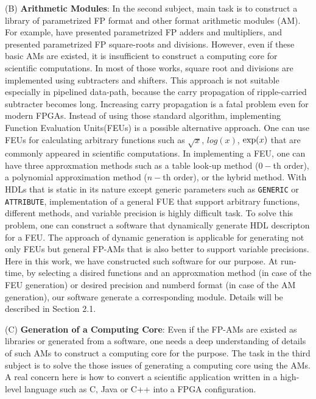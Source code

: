 \documentclass{llncs}
\begin{document}
(B) {\bf Arithmetic Modules}:
In the second subject, main task is to construct a library
of parametrized FP format and other format arithmetic modules (AM). 
For example, \cite{JL01}\cite{LCCN03} have presented parametrized FP adders and
multipliers, and \cite{LKM02}\cite{WN04} presented parametrized FP square-roots and divisions. 
However, even if these basic AMs are existed, 
it is insufficient to construct a computing core for scientific computations.
In most of those works, square root and divisions are implemented
using subtracters and shifters. 
This approach is not suitable especially in pipelined data-path,
because the carry propagation of ripple-carried subtracter becomes long.
Increasing carry propagation is a fatal problem even for modern FPGAs.
Instead of using those standard algorithm, 
implementing Function Evaluation Units(FEUs) is a possible alternative approach.
One can use FEUs for calculating arbitrary functions such as
$\sqrt{x}$, $log(x)$, ${\rm exp}(x)$ that are commonly appeared in 
scientific computations.
In implementing a FEU, one can have three approxmation methods such as
a table look-up method ($0-$th order), a polynomial approximation method ($n-$th order),
or the hybrid method\cite{FO01}\cite{M97}. 
With HDLs that is static in its nature except generic parameters
such as \verb|GENERIC| or \verb|ATTRIBUTE|,
implementation of a general FUE that support arbitrary functions, 
different methods, and variable precision is highly difficult task.
To solve this problem, one can construct a software that dynamically generate 
HDL descripton for a FEU.
The approach of dynamic generation is applicable for generating
not only FEUs but general FP-AMs that is also
better to support variable precisions.
Here in this work, we have constructed such software for our purpose.
At run-time, by selecting a disired functions and an approxmation method
(in case of the FEU generation) or desired precision and numberd format
(in case of the AM generation), our software generate a corresponding module.
Details will be described in Section 2.1.

(C) {\bf Generation of a Computing Core}:
Even if the FP-AMs are existed as libraries or generated
from a software, one needs a deep understanding of details of such AMs
to construct a computing core for the purpose.
The task in the third subject is to solve the those issues
of generating a computing core using the AMs.
A real concern here is how to convert a scientific application
written in a high-level language such as C, Java or C++ into a FPGA configuration.
\end{document}
